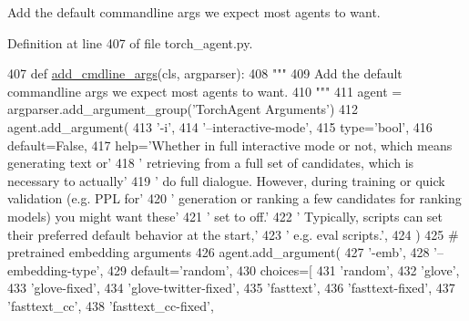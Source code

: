 \begin{DoxyVerb}Add the default commandline args we expect most agents to want.
\end{DoxyVerb}
 

Definition at line 407 of file torch\+\_\+agent.\+py.


\begin{DoxyCode}
407     \textcolor{keyword}{def }\hyperlink{namespaceparlai_1_1agents_1_1drqa_1_1config_a62fdd5554f1da6be0cba185271058320}{add\_cmdline\_args}(cls, argparser):
408         \textcolor{stringliteral}{"""}
409 \textcolor{stringliteral}{        Add the default commandline args we expect most agents to want.}
410 \textcolor{stringliteral}{        """}
411         agent = argparser.add\_argument\_group(\textcolor{stringliteral}{'TorchAgent Arguments'})
412         agent.add\_argument(
413             \textcolor{stringliteral}{'-i'},
414             \textcolor{stringliteral}{'--interactive-mode'},
415             type=\textcolor{stringliteral}{'bool'},
416             default=\textcolor{keyword}{False},
417             help=\textcolor{stringliteral}{'Whether in full interactive mode or not,  which means generating text or'}
418             \textcolor{stringliteral}{' retrieving from a full set of candidates, which is necessary to actually'}
419             \textcolor{stringliteral}{' do full dialogue. However, during training or quick validation (e.g. PPL for'}
420             \textcolor{stringliteral}{' generation or ranking a few candidates for ranking models) you might want these'}
421             \textcolor{stringliteral}{' set to off.'}
422             \textcolor{stringliteral}{' Typically, scripts can set their preferred default behavior at the start,'}
423             \textcolor{stringliteral}{' e.g. eval scripts.'},
424         )
425         \textcolor{comment}{# pretrained embedding arguments}
426         agent.add\_argument(
427             \textcolor{stringliteral}{'-emb'},
428             \textcolor{stringliteral}{'--embedding-type'},
429             default=\textcolor{stringliteral}{'random'},
430             choices=[
431                 \textcolor{stringliteral}{'random'},
432                 \textcolor{stringliteral}{'glove'},
433                 \textcolor{stringliteral}{'glove-fixed'},
434                 \textcolor{stringliteral}{'glove-twitter-fixed'},
435                 \textcolor{stringliteral}{'fasttext'},
436                 \textcolor{stringliteral}{'fasttext-fixed'},
437                 \textcolor{stringliteral}{'fasttext\_cc'},
438                 \textcolor{stringliteral}{'fasttext\_cc-fixed'},

\end{DoxyCode}
